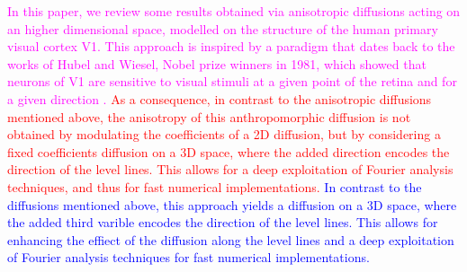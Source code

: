 \documentclass[proc]{edpsmath}
\begin{document}
\textcolor{magenta}{
In this paper, we review some results obtained via anisotropic diffusions acting on an higher dimensional space, modelled on the structure of the human primary visual cortex V1.
This approach is inspired by a paradigm that dates back to the works of Hubel and Wiesel, Nobel prize winners in 1981, which showed that neurons of V1 are sensitive to visual stimuli at a given point of the retina and for a given direction \cite{hubel}. 
\textcolor{red}{
As a consequence, in contrast to the anisotropic diffusions mentioned above, the anisotropy of this anthropomorphic diffusion is not obtained by modulating the coefficients of a 2D diffusion, but by considering a fixed coefficients diffusion on a 3D space, where the added direction encodes the direction of the level lines. This allows for a deep exploitation of Fourier analysis techniques, and thus for fast numerical implementations.
}
\textcolor{blue}{
In contrast to the diffusions mentioned above, this approach yields a diffusion on a 3D space, where the added third varible encodes the direction of the level lines. 
This allows for enhancing the effiect of the diffusion along the level lines and a deep exploitation of Fourier analysis techniques for fast numerical implementations.
}
}



\end{document}
